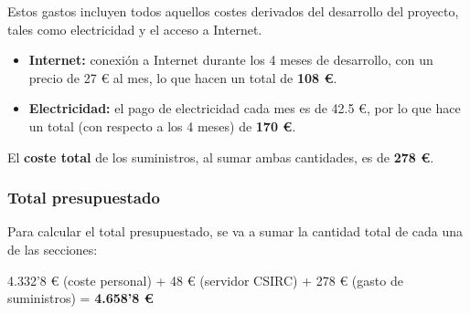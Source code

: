 Estos gastos incluyen todos aquellos costes derivados del desarrollo del proyecto, tales como electricidad y el acceso a Internet.

\begin{itemize}
    \item \textbf{Internet:} conexión a Internet durante los 4 meses de desarrollo, con un precio de 27 € al mes, lo que hacen un total de \textbf{108 €}.
    \item \textbf{Electricidad:} el pago de electricidad cada mes es de 42.5 €, por lo que hace un total (con respecto a los 4 meses) de \textbf{170 €}.
\end{itemize}

El \textbf{coste total} de los suministros, al sumar ambas cantidades, es de \textbf{278 €}.

\subsubsection{Total presupuestado}

Para calcular el total presupuestado, se va a sumar la cantidad total de cada una de las secciones: 

4.332'8 € (coste personal) + 48 € (servidor CSIRC) + 278 € (gasto de suministros) = \textbf{4.658'8 €}